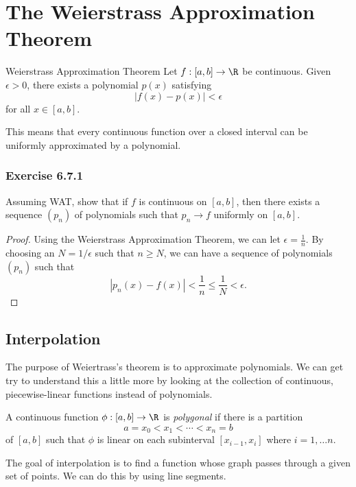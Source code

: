 \section{The Weierstrass Approximation Theorem}

\begin{theorem}{Weierstrass Approximation Theorem}{}
        Let \( f: [a,b] \to \R  \) be continuous. Given \( \epsilon > 0  \), there exists a polynomial \( p(x) \) satisfying 
        \[  | f(x) - p(x) | < \epsilon \] for all \( x \in [a,b] \).
    \end{theorem}

This means that every continuous function over a closed interval can be uniformly approximated by a polynomial.

\subsubsection{Exercise 6.7.1} Assuming WAT, show that if \( f \) is continuous on \( [a,b] \), then there exists a sequence \( (p_n) \) of polynomials such that \( p_n \to f  \) uniformly on \( [a,b] \).

\begin{proof}
    Using the Weierstrass Approximation Theorem, we can let \( \epsilon  = \frac{ 1 }{ n }  \). By choosing an \( N = 1 / \epsilon   \) such that \( n \geq N  \), we can have a sequence of polynomials \( (p_n) \) such that 
    \[ | p_{n}(x) - f(x)  | < \frac{ 1 }{ n  } \leq \frac{ 1 }{ N } < \epsilon.  \]
\end{proof}

\subsection{Interpolation}

The purpose of Weiertrass's theorem is to approximate polynomials. We can get try to understand this a little more by looking at the collection of continuous, piecewise-linear functions instead of polynomials.

\begin{definition}{}{}
    A continuous function \( \phi : [a,b] \to \R  \) is \textit{polygonal} if there is a partition 
    \[  a = x_{0} < x_{1} < \dotsb < x_{n} = b   \] of \( [a,b] \) such that \( \phi  \) is linear on each subinterval \( [x_{i-1}, x_{i}] \) where \(  i = 1, \dots n. \)
\end{definition}

The goal of interpolation is to find a function whose graph passes through a given set of points. We can do this by using line segments.

